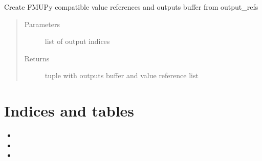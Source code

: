 \documentclass[letterpaper,10pt,english]{sphinxmanual}
\begin{document}

\begin{fulllineitems}
\label{\detokenize{blueprints:files.blueprints.fmu.prepare_outputs}}
Create FMUPy compatible value references and outputs buffer from output\_refs
\begin{quote}\begin{description}
\item[{Parameters}] \leavevmode
{} \textendash{} list of output indices

\item[{Returns}] \leavevmode
tuple with outputs buffer and value reference list

\end{description}\end{quote}

\end{fulllineitems}



\chapter{Indices and tables}
\label{\detokenize{index:indices-and-tables}}\begin{itemize}
\item {} 

\item {} 

\item {} 

\end{itemize}
\end{document}
